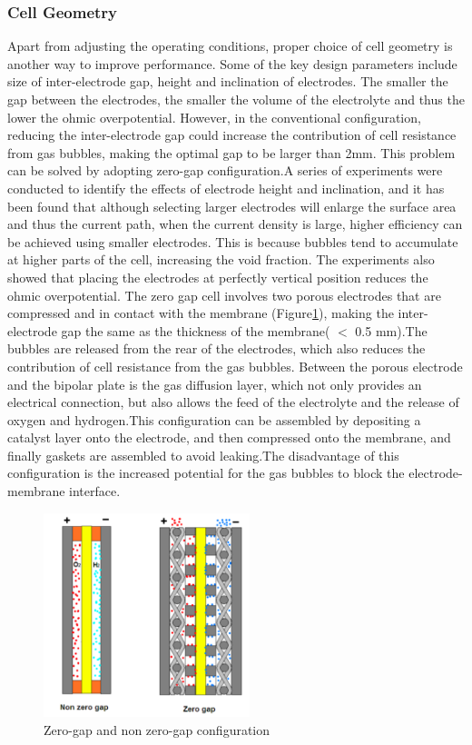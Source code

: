 \subsubsection{Cell Geometry} 
Apart from adjusting the operating conditions, proper choice of cell geometry is another way to improve performance. Some of the key design parameters include size of inter-electrode gap, height and inclination of electrodes. The smaller the gap between the electrodes, the smaller the volume of the electrolyte and thus the lower the ohmic overpotential. However, in the conventional configuration, reducing the inter-electrode gap could increase the contribution of cell resistance from gas bubbles, making the optimal gap to be larger than 2mm. This problem can be solved by adopting zero-gap configuration.\cite{zerogap}A series of experiments\cite{geometry} were conducted to identify the effects of electrode height and inclination, and it has been found that although selecting larger electrodes will enlarge the surface area and thus the current path, when the current density is large, higher efficiency can be achieved using smaller electrodes. This is 
because bubbles tend to accumulate at higher parts of the cell, increasing the void fraction. The experiments also showed that placing the electrodes at perfectly vertical position reduces the ohmic overpotential. 
The zero gap cell involves two porous electrodes that are compressed and in contact with the membrane (Figure\ref{fig:Data1}), making the inter-electrode gap the same as the thickness of the membrane( $<$  0.5 mm).\cite{zerogap}The bubbles are released from the rear of the electrodes, which also reduces the contribution of cell resistance from the gas bubbles. Between the porous electrode and the bipolar plate is the gas diffusion layer, which not only provides an electrical connection, but also allows the feed of the electrolyte and the release of oxygen and hydrogen.This configuration can be assembled by depositing a catalyst layer onto the electrode, and then compressed onto the membrane, and finally gaskets are assembled to avoid leaking.The disadvantage of this configuration is the increased potential for the gas bubbles to block the electrode-membrane interface.
\begin{figure}[H] 
\centering
\includegraphics[width=6cm]{zerogap.png}
\caption{Zero-gap and non zero-gap configuration\cite{cathode2}}
\label{fig:Data1}
\end{figure}

